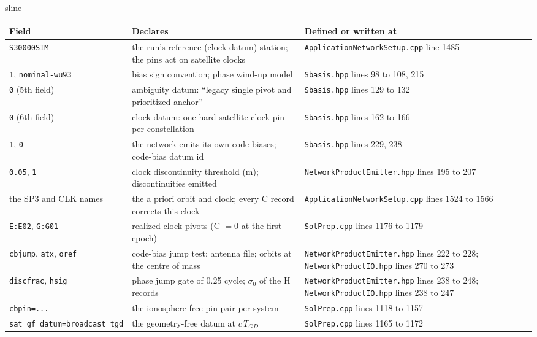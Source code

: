 \begin{answer}{sline}
\solution
\begin{center}\footnotesize
\begin{tabular}{@{}p{4.6cm}p{5.4cm}p{4.8cm}@{}}
\toprule
Field & Declares & Defined or written at \\
\midrule
\texttt{S30000SIM} & the run's reference (clock-datum) station; the pins act on satellite clocks & \texttt{ApplicationNetworkSetup.cpp} line 1485 \\
\texttt{1}, \texttt{nominal-wu93} & bias sign convention; phase wind-up model & \texttt{Sbasis.hpp} lines 98 to 108, 215 \\
\texttt{0} (5th field) & ambiguity datum: ``legacy single pivot and prioritized anchor'' & \texttt{Sbasis.hpp} lines 129 to 132 \\
\texttt{0} (6th field) & clock datum: one hard satellite clock pin per constellation & \texttt{Sbasis.hpp} lines 162 to 166 \\
\texttt{1}, \texttt{0} & the network emits its own code biases; code-bias datum id & \texttt{Sbasis.hpp} lines 229, 238 \\
\texttt{0.05}, \texttt{1} & clock discontinuity threshold (m); discontinuities emitted & \texttt{NetworkProductEmitter.hpp} lines 195 to 207 \\
the SP3 and CLK names & the a priori orbit and clock; every C record corrects this clock & \texttt{ApplicationNetworkSetup.cpp} lines 1524 to 1566 \\
\texttt{E:E02}, \texttt{G:G01} & realized clock pivots (C $= 0$ at the first epoch) & \texttt{SolPrep.cpp} lines 1176 to 1179 \\
\texttt{cbjump}, \texttt{atx}, \texttt{oref} & code-bias jump test; antenna file; orbits at the centre of mass & \texttt{NetworkProductEmitter.hpp} lines 222 to 228; \texttt{NetworkProductIO.hpp} lines 270 to 273 \\
\texttt{discfrac}, \texttt{hsig} & phase jump gate of 0.25 cycle; $\sigma_0$ of the H records & \texttt{NetworkProductEmitter.hpp} lines 238 to 248; \texttt{NetworkProductIO.hpp} lines 238 to 247 \\
\texttt{cbpin=...} & the ionosphere-free pin pair per system & \texttt{SolPrep.cpp} lines 1118 to 1157 \\
\texttt{sat\_gf\_datum=broadcast\_tgd} & the geometry-free datum at $c\,T_{GD}$ & \texttt{SolPrep.cpp} lines 1165 to 1172 \\

\end{tabular}
\end{center}
\end{answer}
